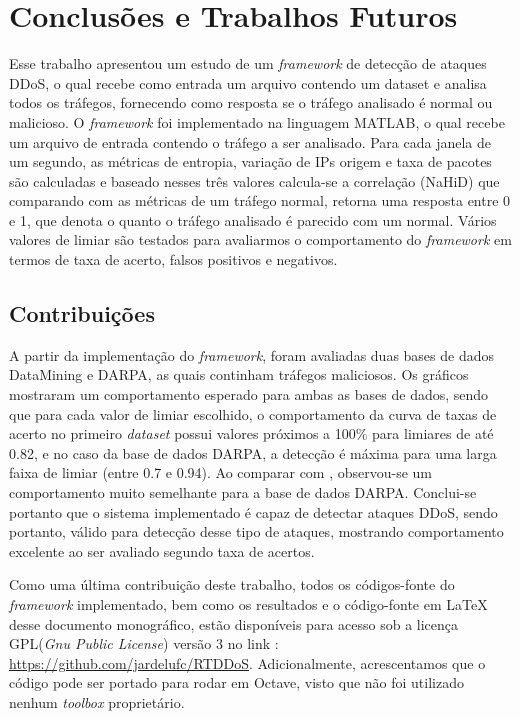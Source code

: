 \chapter[Conclusões e Trabalhos Futuros]{Conclusões e Trabalhos Futuros}
Esse trabalho apresentou um estudo de um \textit{framework} de detecção de ataques DDoS, o qual recebe como entrada um arquivo contendo um dataset e analisa todos os tráfegos, fornecendo como resposta se o tráfego analisado é normal ou malicioso. O \textit{framework} foi implementado na linguagem MATLAB, o qual recebe um arquivo de entrada contendo o tráfego a ser analisado. Para cada janela de um segundo, as métricas de entropia, variação de IPs origem e taxa de pacotes são calculadas e baseado nesses três valores calcula-se a correlação (NaHiD) que comparando com as métricas de um tráfego normal, retorna uma resposta entre 0 e 1, que denota o quanto o tráfego analisado é parecido com um normal. Vários valores de limiar são testados para avaliarmos o comportamento do \textit{framework} em termos de taxa de acerto, falsos positivos e negativos.

\section{Contribuições}

A partir da implementação do \textit{framework}, foram avaliadas duas bases de dados DataMining e DARPA, as quais continham tráfegos maliciosos. Os gráficos mostraram um comportamento esperado para ambas as bases de dados, sendo que para cada valor de limiar escolhido, o comportamento da curva de taxas de acerto no primeiro \textit{dataset} possui valores próximos a 100\% para limiares de até 0.82, e no caso da base de dados DARPA, a detecção é máxima para uma larga faixa de limiar (entre 0.7 e 0.94). Ao comparar com \cite{HOQUE201748}, observou-se um comportamento muito semelhante para a base de dados DARPA. Conclui-se portanto que o sistema implementado é capaz de detectar ataques DDoS, sendo portanto, válido para detecção desse tipo de ataques, mostrando comportamento excelente ao ser avaliado segundo taxa de acertos. 

Como uma última contribuição deste trabalho, todos os códigos-fonte do \textit{framework} implementado, bem como os resultados e o código-fonte em \LaTeX \hspace{0.01cm} desse documento monográfico, estão disponíveis para acesso sob a licença GPL(\textit{Gnu Public License}) versão 3 no link : \url{https://github.com/jardelufc/RTDDoS}. Adicionalmente, acrescentamos que o código pode ser portado para rodar em Octave, visto que não foi utilizado nenhum \textit{toolbox} proprietário.   
